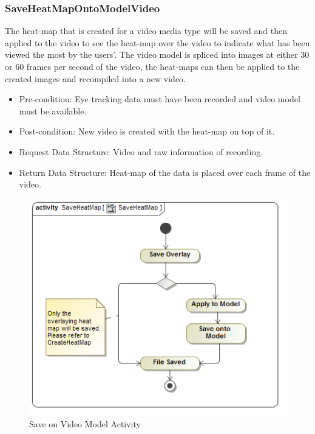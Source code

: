 	\subsubsection{SaveHeatMapOntoModelVideo}
	The heat-map that is created for a video media type will be saved and then applied to the video to see the heat-map over the video to indicate what has been viewed the most by the users'. The video model is spliced into images at either 30 or 60 frames per second of the video, the heat-maps can then be applied to the created images and recompiled into a new video.
	\begin{itemize}
		\item Pre-condition: Eye tracking data must have been recorded and video model must be available.
		\item Post-condition: New video is created with the heat-map on top of it.
		\item Request Data Structure: Video and raw information of recording.
		\item Return Data Structure: Heat-map of the data is placed over each frame of the video.
	\end{itemize}
	\begin{figure}[!ht]
		\centering	
		\includegraphics[scale=0.5,width=15cm,keepaspectratio]{Diagrams/Activity_Diagram__SaveHeatMap__SaveHeatMap.png}	
		\caption{Save on Video Model Activity}
	\end{figure}


